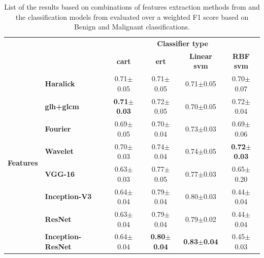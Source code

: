 \documentclass[journal,article,submit,moreauthors,pdftex, applsci]{Definitions/mdpi}
\begin{document}
\begin{table}[h]
    \centering
    \begin{tabular}{llcccc}
    \multicolumn{2}{c}{}                                                &\multicolumn{4}{c}{\textbf{Classifier type}}                                                           \\ \cline{3-6}
    \multicolumn{2}{c}{}                                                &\textbf{\ac{cart}}     &\textbf{\ac{ert}}          &\textbf{Linear \ac{svm}}   &\textbf{RBF \ac{svm}}  \\ \hline
    \multirow{8}{*}{\textbf{Features}}  &\textbf{Haralick}              &0.71$\pm$0.05          &0.71$\pm$0.05              &0.71$\pm$0.05              &0.70$\pm$0.07          \\ \cline{2-6} 
                                        &\textbf{\ac{glh}+\ac{glcm}}    &\textbf{0.71$\pm$0.03} &0.72$\pm$0.05              &0.70$\pm$0.05              &0.72$\pm$0.04          \\ \cline{2-6} 
                                        &\textbf{Fourier}               &0.69$\pm$0.05          &0.70$\pm$0.04              &0.73$\pm$0.03              &0.69$\pm$0.06          \\ \cline{2-6} 
                                        &\textbf{Wavelet}               &0.70$\pm$0.03          &0.74$\pm$0.04              &0.74$\pm$0.05              &\textbf{0.72$\pm$0.03} \\ \cline{2-6} 
                                        &\textbf{VGG-16}                &0.63$\pm$0.03          &0.77$\pm$0.05              &0.77$\pm$0.03              &0.65$\pm$0.20          \\ \cline{2-6} 
                                        &\textbf{Inception-V3}          &0.64$\pm$0.04          &0.79$\pm$0.04              &0.80$\pm$0.03              &0.44$\pm$0.04          \\ \cline{2-6} 
                                        &\textbf{ResNet}                &0.63$\pm$0.04          &0.79$\pm$0.04              &0.79$\pm$0.02              &0.44$\pm$0.04          \\ \cline{2-6} 
                                        &\textbf{Inception-ResNet}      &0.64$\pm$0.04          &\textbf{0.80$\pm$0.04}     &\textbf{0.83$\pm$0.04}     &0.45$\pm$0.03          \\ \hline 
    \end{tabular}    
    \caption{List of the results based on combinations of features extraction methods from  and the classification models from  evaluated over a weighted F1 score based on Benign and Malignant classifications.}
    \label{tab:image_results}
\end{table}
\end{document}
